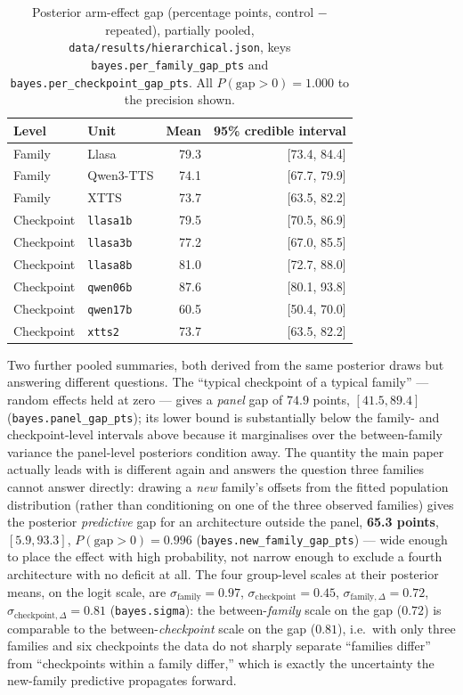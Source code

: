 \documentclass[11pt]{article}
\begin{document}
\begin{table}[h]
\centering
\caption{Posterior arm-effect gap (percentage points, control $-$ repeated),
partially pooled, \texttt{data/results/hierarchical.json}, keys
\texttt{bayes.per\_family\_gap\_pts} and \texttt{bayes.per\_checkpoint\_gap\_pts}.
All $P(\mathrm{gap}>0)=1.000$ to the precision shown.}
\label{tab:hier-bayes}
\small
\begin{tabular}{@{}llrr@{}}
\toprule
Level & Unit & Mean & 95\% credible interval \\
\midrule
Family & Llasa      & 79.3 & [73.4, 84.4] \\
Family & Qwen3-TTS  & 74.1 & [67.7, 79.9] \\
Family & XTTS       & 73.7 & [63.5, 82.2] \\
\addlinespace
Checkpoint & \texttt{llasa1b} & 79.5 & [70.5, 86.9] \\
Checkpoint & \texttt{llasa3b} & 77.2 & [67.0, 85.5] \\
Checkpoint & \texttt{llasa8b} & 81.0 & [72.7, 88.0] \\
Checkpoint & \texttt{qwen06b} & 87.6 & [80.1, 93.8] \\
Checkpoint & \texttt{qwen17b} & 60.5 & [50.4, 70.0] \\
Checkpoint & \texttt{xtts2}   & 73.7 & [63.5, 82.2] \\
\bottomrule
\end{tabular}
\end{table}

Two further pooled summaries, both derived from the same posterior draws but
answering different questions. The ``typical checkpoint of a typical family''
--- random effects held at zero --- gives a \emph{panel} gap of $74.9$ points,
$[41.5, 89.4]$ (\texttt{bayes.panel\_gap\_pts}); its lower bound is
substantially below the family- and checkpoint-level intervals above because
it marginalises over the between-family variance the panel-level posteriors
condition away. The quantity the main paper actually leads with is different
again and answers the question three families cannot answer directly: drawing
a \emph{new} family's offsets from the fitted population distribution (rather
than conditioning on one of the three observed families) gives the posterior
\emph{predictive} gap for an architecture outside the panel, \textbf{65.3
points}, $[5.9, 93.3]$, $P(\mathrm{gap}>0)=0.996$
(\texttt{bayes.new\_family\_gap\_pts}) --- wide enough to place the effect with
high probability, not narrow enough to exclude a fourth architecture with no
deficit at all. The four group-level scales at their posterior means, on the
logit scale, are $\sigma_{\mathrm{family}}=0.97$,
$\sigma_{\mathrm{checkpoint}}=0.45$, $\sigma_{\mathrm{family},\Delta}=0.72$,
$\sigma_{\mathrm{checkpoint},\Delta}=0.81$ (\texttt{bayes.sigma}): the
between-\emph{family} scale on the gap ($0.72$) is comparable to the
between-\emph{checkpoint} scale on the gap ($0.81$), i.e.\ with only three
families and six checkpoints the data do not sharply separate ``families
differ'' from ``checkpoints within a family differ,'' which is exactly the
uncertainty the new-family predictive propagates forward.
\end{document}
